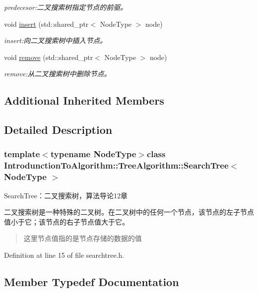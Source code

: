 \begin{DoxyCompactItemize}
\begin{DoxyCompactList}\small\item\em predecesor\+:二叉搜索树指定节点的前驱。 \end{DoxyCompactList}\item 
void \hyperlink{class_introdunction_to_algorithm_1_1_tree_algorithm_1_1_search_tree_aa65abd78c422c5162804932dc9b47ae7}{insert} (std\+::shared\+\_\+ptr$<$ Node\+Type $>$ node)
\begin{DoxyCompactList}\small\item\em insert\+:向二叉搜索树中插入节点。 \end{DoxyCompactList}\item 
void \hyperlink{class_introdunction_to_algorithm_1_1_tree_algorithm_1_1_search_tree_a80dffa04b166dbb9c04c97ea5b42dfc9}{remove} (std\+::shared\+\_\+ptr$<$ Node\+Type $>$ node)
\begin{DoxyCompactList}\small\item\em remove\+:从二叉搜索树中删除节点。 \end{DoxyCompactList}\end{DoxyCompactItemize}
\subsection*{Additional Inherited Members}


\subsection{Detailed Description}
\subsubsection*{template$<$typename Node\+Type$>$class Introdunction\+To\+Algorithm\+::\+Tree\+Algorithm\+::\+Search\+Tree$<$ Node\+Type $>$}

Search\+Tree：二叉搜索树，算法导论12章 

二叉搜索树是一种特殊的二叉树。在二叉树中的任何一个节点，该节点的左子节点值小于它；该节点的右子节点值大于它。

\begin{quote}
这里节点值指的是节点存储的数据的值\end{quote}


Definition at line 15 of file searchtree.\+h.



\subsection{Member Typedef Documentation}
\hypertarget{class_introdunction_to_algorithm_1_1_tree_algorithm_1_1_search_tree_a455a92d072da5c55c969cdfc0e71ac2e}{}
